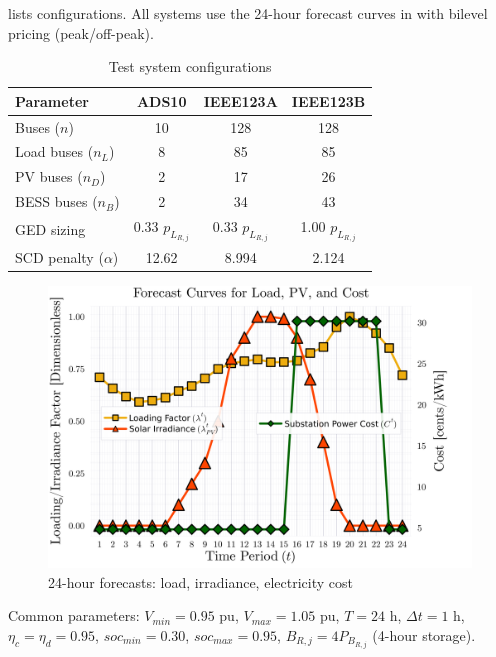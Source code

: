  lists configurations. All systems use the 24-hour forecast curves in  with bilevel pricing (peak/off-peak).

\begin{table}[h]
    \centering
    \caption{Test system configurations}
    \label{table:mpopf-tradeoffs-system-config}
    \begin{tabular}{|l|c|c|c|}
    \hline
    \textbf{Parameter} & \textbf{ADS10} & \textbf{IEEE123A} & \textbf{IEEE123B} \\ \hline
    Buses ($n$) & 10 & 128 & 128 \\ \hline
    Load buses ($n_{L}$) & 8 & 85 & 85 \\ \hline
    PV buses ($n_{D}$) & 2 & 17 & 26 \\ \hline
    BESS buses ($n_{B}$) & 2 & 34 & 43 \\ \hline
    GED sizing & 0.33 $p_{L_{R,j}}$ & 0.33 $p_{L_{R,j}}$ & 1.00 $p_{L_{R,j}}$ \\ \hline
    SCD penalty ($\alpha$) & 12.62 & 8.994 & 2.124 \\ \hline
    \end{tabular}
\end{table}

\begin{figure}[h]
    \centering
    \includegraphics[height=0.22\textheight]{figures/T24-inputCurves/Horizon_24_InputForecastCurves_bilevelCosts.png}
    \caption{24-hour forecasts: load, irradiance, electricity cost}
    \label{fig:mpopf-tradeoffs-input-curves}
\end{figure}

Common parameters: $V_{min}=0.95$ pu, $V_{max}=1.05$ pu, $T=24$ h, $\Delta t=1$ h, $\eta_c=\eta_d=0.95$, $soc_{min}=0.30$, $soc_{max}=0.95$, $B_{R,j} = 4 P_{B_{R,j}}$ (4-hour storage).

